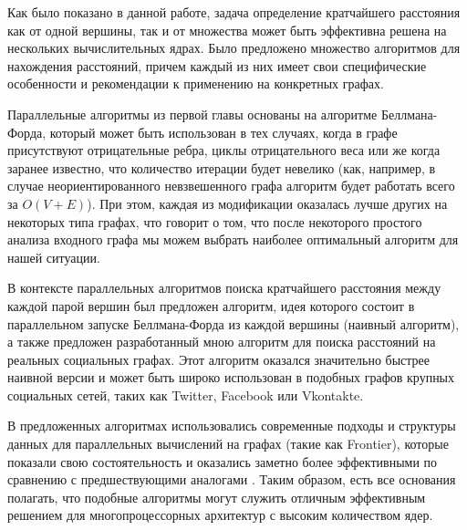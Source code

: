 \startconclusionpage

Как было показано в данной работе, задача определение кратчайшего расстояния как от одной вершины, так и от множества может быть эффективна решена на нескольких вычислительных ядрах. Было предложено множество алгоритмов для нахождения расстояний, причем каждый из них имеет свои специфические особенности и рекомендации к применению на конкретных графах.

Параллельные алгоритмы из первой главы основаны на алгоритме Беллмана-Форда, который может быть использован в тех случаях, когда в графе присутствуют отрицательные ребра, циклы отрицательного веса или же когда заранее известно, что количество итерации будет невелико (как, например, в случае неориентированного невзвешенного графа алгоритм будет работать всего за $O(V + E)$). При этом, каждая из модификации оказалась лучше других на некоторых типа графах, что говорит о том, что после некоторого простого анализа входного графа мы можем выбрать наиболее оптимальный алгоритм для нашей ситуации.

В контексте параллельных алгоритмов поиска кратчайшего расстояния между каждой парой вершин был предложен алгоритм, идея которого состоит в параллельном запуске Беллмана-Форда из каждой вершины (наивный алгоритм), а также предложен разработанный мною алгоритм  для поиска расстояний на реальных социальных графах. Этот алгоритм оказался значительно быстрее наивной версии и может быть широко использован в подобных графов крупных социальных сетей, таких как Twitter, Facebook или Vkontakte. 

В предложенных алгоритмах использовались современные подходы и структуры данных для параллельных вычислений на графах (такие как Frontier), которые показали свою состоятельность и оказались заметно более эффективными по сравнению с предшествующими аналогами \cite{LIGRA}. Таким образом, есть все основания полагать, что подобные алгоритмы могут служить отличным эффективным решением для многопроцессорных архитектур с высоким количеством ядер.  

\FloatBarrier
